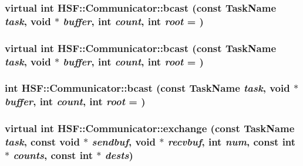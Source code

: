 \label{classHSF_1_1Communicator_a268366a86ccbb00d630b9b660a02b7c2}
\hypertarget{classHSF_1_1Communicator_aff3c788234ad6dfa837be18776f84690}{
\subsubsection[{bcast}]{\setlength{\rightskip}{0pt plus 5cm}virtual int HSF::Communicator::bcast (const {\bf TaskName} {\em task}, \/  void $\ast$ {\em buffer}, \/  int {\em count}, \/  int {\em root} = {})}}
\label{classHSF_1_1Communicator_aff3c788234ad6dfa837be18776f84690}
\hypertarget{classHSF_1_1Communicator_aff3c788234ad6dfa837be18776f84690}{
\subsubsection[{bcast}]{\setlength{\rightskip}{0pt plus 5cm}virtual int HSF::Communicator::bcast (const {\bf TaskName} {\em task}, \/  void $\ast$ {\em buffer}, \/  int {\em count}, \/  int {\em root} = {})}}
\label{classHSF_1_1Communicator_aff3c788234ad6dfa837be18776f84690}
\hypertarget{classHSF_1_1Communicator_a936cbdaf86f7ff982c50b17d1958051c}{
\subsubsection[{bcast}]{\setlength{\rightskip}{0pt plus 5cm}int HSF::Communicator::bcast (const {\bf TaskName} {\em task}, \/  void $\ast$ {\em buffer}, \/  int {\em count}, \/  int {\em root} = {})}}
\label{classHSF_1_1Communicator_a936cbdaf86f7ff982c50b17d1958051c}
\hypertarget{classHSF_1_1Communicator_a9459ed3c5350a046e5ab91ae329e650b}{
\subsubsection[{exchange}]{\setlength{\rightskip}{0pt plus 5cm}virtual int HSF::Communicator::exchange (const {\bf TaskName} {\em task}, \/  const void $\ast$ {\em sendbuf}, \/  void $\ast$ {\em recvbuf}, \/  int {\em num}, \/  const int $\ast$ {\em counts}, \/  const int $\ast$ {\em dests})}}
